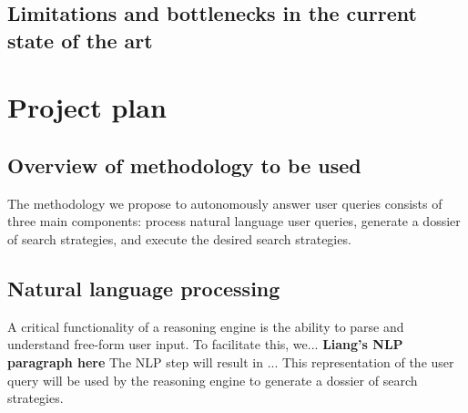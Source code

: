 \documentclass[11pt,notitlepage]{article}
\begin{document}
\subsection{Limitations and bottlenecks in the current state of the art}

\section{Project plan}
\subsection{Overview of methodology to be used}
The methodology we propose to autonomously answer user queries consists of three main components: process natural language user queries, generate a dossier of search strategies, and execute the desired search strategies.
\subsection{Natural language processing}
A critical functionality of a reasoning engine is the ability to parse and understand free-form user input. To facilitate this, we...
\textbf{Liang's NLP paragraph here}
The NLP step will result in ... This representation of the user query will be used by the reasoning engine to generate a dossier of search strategies. 
\end{document}
